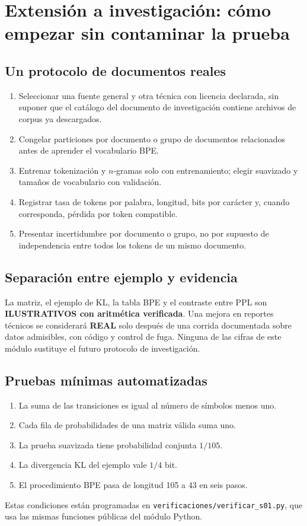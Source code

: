 \documentclass[11pt,a4paper]{report}
\begin{document}
\chapter{Extensión a investigación: cómo empezar sin contaminar la prueba}
\section{Un protocolo de documentos reales}
\begin{enumerate}
\item Seleccionar una fuente general y otra técnica con licencia declarada,
sin suponer que el catálogo del documento de investigación contiene
archivos de corpus ya descargados.
\item Congelar particiones por documento o grupo de documentos relacionados
antes de aprender el vocabulario BPE.
\item Entrenar tokenización y $n$-gramas solo con entrenamiento;
elegir suavizado y tamaños de vocabulario con validación.
\item Registrar tasa de tokens por palabra, longitud, bits por carácter
y, cuando corresponda, pérdida por token compatible.
\item Presentar incertidumbre por documento o grupo, no por supuesto de
independencia entre todos los tokens de un mismo documento.
\end{enumerate}
\section{Separación entre ejemplo y evidencia}
La matriz, el ejemplo de KL, la tabla BPE y el contraste entre PPL
son \textbf{ILUSTRATIVOS con aritmética verificada}. Una mejora en
reportes técnicos se considerará \textbf{REAL} solo después de una
corrida documentada sobre datos admisibles, con código y control de
fuga. Ninguna de las cifras de este módulo sustituye el futuro
protocolo de investigación.
\section{Pruebas mínimas automatizadas}
\begin{enumerate}
\item La suma de las transiciones es igual al número de símbolos
menos uno.
\item Cada fila de probabilidades de una matriz válida suma uno.
\item La prueba suavizada tiene probabilidad conjunta $1/105$.
\item La divergencia KL del ejemplo vale $1/4$ bit.
\item El procedimiento BPE pasa de longitud 105 a 43 en seis pasos.
\end{enumerate}
Estas condiciones están programadas en
\texttt{verificaciones/verificar\_s01.py}, que usa las mismas
funciones públicas del módulo Python.
\end{document}
